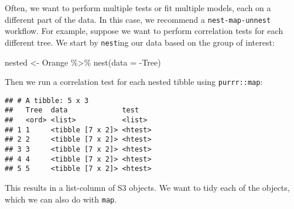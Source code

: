 \documentclass[
]{book}
\newenvironment{Shaded}{\begin{snugshade}}{\end{snugshade}}
\newcommand{\AttributeTok}[1]{\textcolor[rgb]{0.77,0.63,0.00}{#1}}
\newcommand{\CommentTok}[1]{\textcolor[rgb]{0.56,0.35,0.01}{\textit{#1}}}
\newcommand{\FunctionTok}[1]{\textcolor[rgb]{0.00,0.00,0.00}{#1}}
\newcommand{\NormalTok}[1]{#1}
\newcommand{\OtherTok}[1]{\textcolor[rgb]{0.56,0.35,0.01}{#1}}
\newcommand{\SpecialCharTok}[1]{\textcolor[rgb]{0.00,0.00,0.00}{#1}}
\begin{document}
Often, we want to perform multiple tests or fit multiple models, each on a different part of the data. In this case, we recommend a \texttt{nest-map-unnest} workflow. For example, suppose we want to perform correlation tests for each different tree. We start by \texttt{nest}ing our data based on the group of interest:

\begin{Shaded}
\begin{Highlighting}[]
\NormalTok{nested }\OtherTok{\textless{}{-}}\NormalTok{ Orange }\SpecialCharTok{\%\textgreater{}\%}
  \FunctionTok{nest}\NormalTok{(}\AttributeTok{data =} \SpecialCharTok{{-}}\NormalTok{Tree)}
\end{Highlighting}
\end{Shaded}

Then we run a correlation test for each nested tibble using \texttt{purrr::map}:

\begin{Shaded}
\end{Shaded}

\begin{verbatim}
## # A tibble: 5 x 3
##   Tree  data             test   
##   <ord> <list>           <list> 
## 1 1     <tibble [7 x 2]> <htest>
## 2 2     <tibble [7 x 2]> <htest>
## 3 3     <tibble [7 x 2]> <htest>
## 4 4     <tibble [7 x 2]> <htest>
## 5 5     <tibble [7 x 2]> <htest>
\end{verbatim}

This results in a list-column of S3 objects. We want to tidy each of the objects, which we can also do with \texttt{map}.

\begin{Shaded}
\end{Shaded}
\end{document}
